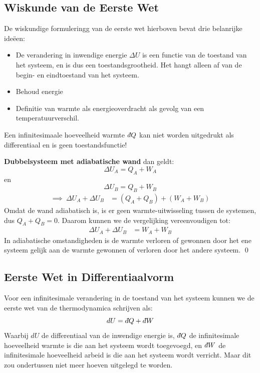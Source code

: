 \subsection{Wiskunde van de Eerste Wet}

De wiskundige formuleringg van de eerste wet hierboven bevat drie belanrijke ideëen:
\begin{itemize}
    \item De verandering in inwendige energie $\Delta U$ is een functie van de toestand van het systeem, en is dus een toestandsgrootheid. Het hangt alleen af van de begin- en eindtoestand van het systeem.
    \item Behoud energie
    \item Definitie van warmte als energieoverdracht als gevolg van een temperatuurverschil.
\end{itemize}


Een infinitesimaale hoeveelheid warmte \(\dbar Q\) kan niet worden uitgedrukt als differentiaal en is geen toestandsfunctie!

\begin{derivation}
    \textbf{Dubbelsysteem met adiabatische wand} dan geldt:
    \[ \Delta U_A = Q_A + W_A \]
    en
    \[ \Delta U_B = Q_B + W_B \]
    \begin{align*}
        \implies \
        \Delta U_A + \Delta U_B &= (Q_A + Q_B) + (W_A + W_B)
    \end{align*}
        Omdat de wand adiabatisch is, is er geen warmte-uitwisseling tussen de systemen, dus \(Q_A + Q_B = 0\). Daarom kunnen we de vergelijking vereenvoudigen tot:
    \begin{align*}
        \Delta U_A + \Delta U_B &= W_A + W_B
    \end{align*}
    In adiabatische omstandigheden is de warmte verloren of gewonnen door het ene systeem gelijk aan de warmte gewonnen of verloren door het andere systeem.
    \qed
\end{derivation}


\subsection{Eerste Wet in Differentiaalvorm}

Voor een infinitesimale verandering in de toestand van het systeem kunnen we de eerste wet van de thermodynamica schrijven als:
\begin{equation}
    dU = \dbar Q + \dbar W
\end{equation}
Waarbij \(dU\) de differentiaal van de inwendige energie is, \(\dbar Q\) de infinitesimale hoeveelheid warmte is die aan het systeem wordt toegevoegd, en \(\dbar W\) de infinitesimale hoeveelheid arbeid is die aan het systeem wordt verricht.
Maar dit zou ondertussen niet meer hoeven uitgelegd te worden.

